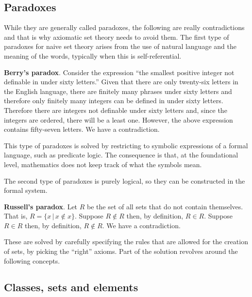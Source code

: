 \documentclass{article}
\begin{document}
\subsection{Paradoxes}

While they are generally called paradoxes, the following are really contradictions and that is why axiomatic set theory needs to avoid them. The first type of paradoxes for naive set theory arises from the use of natural language and the meaning of the words, typically when this is self-referential.

\textbf{Berry's paradox}. Consider the expression ``the smallest positive integer not definable in under sixty letters.'' Given that there are only twenty-six letters in the English language, there are finitely many phrases under sixty letters and therefore only finitely many integers can be defined in under sixty letters. Therefore there are integers not definable under sixty letters and, since the integers are ordered, there will be a least one. However, the above expression contains fifty-seven letters. We have a contradiction.

This type of paradoxes is solved by restricting to symbolic expressions of a formal language, such as predicate logic. The consequence is that, at the foundational level, mathematics does not keep track of what the symbols mean.

The second type of paradoxes is purely logical, so they can be constructed in the formal system.

\textbf{Russell's paradox}. Let $R$ be the set of all sets that do not contain themselves. That is, $R=\{ x \, | \, x \notin x\}$. Suppose $R \notin R$ then, by definition, $R \in R$. Suppose $R \in R$ then, by definition, $R \notin R$. We have a contradiction.

These are solved by carefully specifying the rules that are allowed for the creation of sets, by picking the ``right'' axioms. Part of the solution revolves around the following concepts.



\subsection{Classes, sets and elements}
\end{document}
